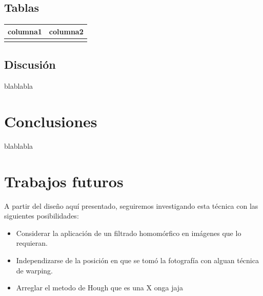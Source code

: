 \documentclass[conference,spanish,a4paper,10pt,oneside,final]{tfmpd}
\begin{document}
\subsection{Tablas}
\begin{tabular}{cc}
\hline columna1 & columna2 \\ 
\hline  &  \\ 
\hline 
\end{tabular} 
%
%
%
%
\subsection{Discusión}
blablabla
%
%
%
%
\section{Conclusiones}
blablabla
%
%
%
%
\section{Trabajos futuros}
A partir del diseño aquí presentado, seguiremos investigando esta técnica con las siguientes
posibilidades:
\begin{itemize}
\item Considerar la aplicación de un filtrado homomórfico en imágenes que lo requieran.
\item Independizarse de la posición en que se tomó la fotografía con alguan técnica de warping.
\item Arreglar el metodo de Hough que es una X onga jaja
\end{itemize}

\nocite{*}


\end{document}
